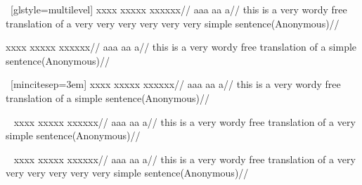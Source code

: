 \documentclass{article}
\begin{document}
\ex~[glstyle=multilevel]
\begingl
\gla xxxx xxxxx xxxxxx//
\glb aaa aa a//
\glft this is a very wordy free translation
of a very very very
very very very
simple sentence\hfill (Anonymous)//
\endgl
\xe



\ex
\begingl
\gla xxxx xxxxx xxxxxx//
\glb aaa aa a//
\glft this is a very wordy free translation
of a simple sentence\givecite (Anonymous)//
\endgl
\xe

\ex~[mincitesep=3em]
\begingl
\gla xxxx xxxxx xxxxxx//
\glb aaa aa a//
\glft this is a very wordy free translation
of a simple sentence\givecite (Anonymous)//
\endgl
\xe

\ex~
\begingl
\gla xxxx xxxxx xxxxxx//
\glb aaa aa a//
\glft this is a very wordy free translation
of a very simple sentence\givecite (Anonymous)//
\endgl
\xe

\ex~
\begingl
\gla xxxx xxxxx xxxxxx//
\glb aaa aa a//
\glft this is a very wordy free translation
of a very very very
very very very
simple sentence\givecite (Anonymous)//
\endgl
\xe
\end{document}
